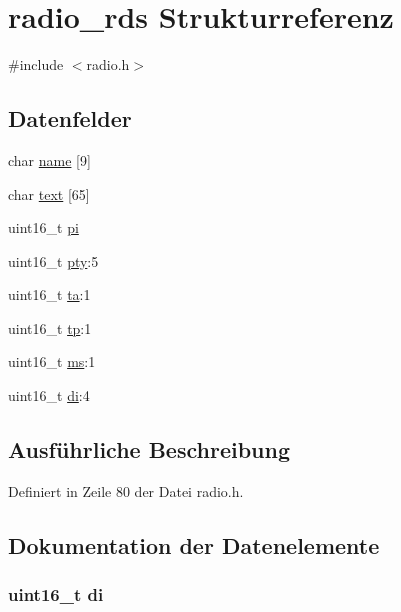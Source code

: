 \hypertarget{structradio__rds}{}\section{radio\+\_\+rds Strukturreferenz}
\label{structradio__rds}


{\ttfamily \#include $<$radio.\+h$>$}

\subsection*{Datenfelder}
\begin{DoxyCompactItemize}
\item 
char \hyperlink{structradio__rds_a00c5e915306c0baea463b99ba6c09c4f}{name} \mbox{[}9\mbox{]}
\item 
char \hyperlink{structradio__rds_a1d7cd4d36a6a2fa49631cef5d5847187}{text} \mbox{[}65\mbox{]}
\item 
uint16\+\_\+t \hyperlink{structradio__rds_ad1803744db28ac0d226ec8da9134598e}{pi}
\item 
uint16\+\_\+t \hyperlink{structradio__rds_a6a555813c441b0e0dce51020817fa68e}{pty}\+:5
\item 
uint16\+\_\+t \hyperlink{structradio__rds_aaa7c4cc5a934d489d475d0f7d26e437c}{ta}\+:1
\item 
uint16\+\_\+t \hyperlink{structradio__rds_a92aabb0ca71171ea02dd5cf0ada0d536}{tp}\+:1
\item 
uint16\+\_\+t \hyperlink{structradio__rds_a8d03256977e8f265177523adc9bab6c0}{ms}\+:1
\item 
uint16\+\_\+t \hyperlink{structradio__rds_aaea7b514ca0c80db1989dc43cf4fe3c1}{di}\+:4
\end{DoxyCompactItemize}


\subsection{Ausführliche Beschreibung}


Definiert in Zeile 80 der Datei radio.\+h.



\subsection{Dokumentation der Datenelemente}
\hypertarget{structradio__rds_aaea7b514ca0c80db1989dc43cf4fe3c1}{}
\subsubsection[{di}]{\setlength{\rightskip}{0pt plus 5cm}uint16\+\_\+t di}\label{structradio__rds_aaea7b514ca0c80db1989dc43cf4fe3c1}


